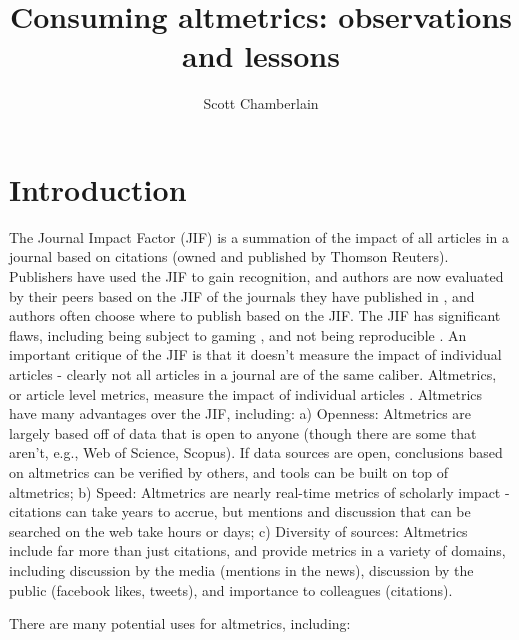 \documentclass[letterpaper,superscriptaddress,showkeys,longbibliography]{revtex4-1}\usepackage{graphicx, color}
\begin{document}

\title{Consuming altmetrics: observations and lessons}

\author{Scott Chamberlain}


\maketitle

\section*{Introduction}

The Journal Impact Factor (JIF) \cite{garfield1955,garfield2006} is a summation of the impact of all articles in a journal based on citations (owned and published by Thomson Reuters). Publishers have used the JIF to gain recognition, and authors are now evaluated by their peers based on the JIF of the journals they have published in \cite{monastersky2005}, and authors often choose where to publish based on the JIF. The JIF has significant flaws, including being subject to gaming \cite{ploseditorial}, and not being reproducible \cite{rossner2007}. An important critique of the JIF is that it doesn't measure the impact of individual articles - clearly not all articles in a journal are of the same caliber. Altmetrics, or article level metrics, measure the impact of individual articles \cite{priem2012}. Altmetrics have many advantages over the JIF, including: a) Openness: Altmetrics are largely based off of data that is open to anyone (though there are some that aren't, e.g., Web of Science, Scopus). If data sources are open, conclusions based on altmetrics can be verified by others, and tools can be built on top of altmetrics; b) Speed: Altmetrics are nearly real-time metrics of scholarly impact \cite{priem2012} - citations can take years to accrue, but mentions and discussion that can be searched on the web take hours or days; c) Diversity of sources: Altmetrics include far more than just citations, and provide metrics in a variety of domains, including discussion by the media (mentions in the news), discussion by the public (facebook likes, tweets), and importance to colleagues (citations).

There are many potential uses for altmetrics, including: 
\end{document}
